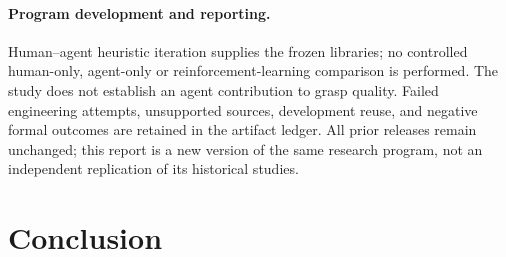 \paragraph{Program development and reporting.}
Human--agent heuristic iteration supplies the frozen libraries; no controlled
human-only, agent-only or reinforcement-learning comparison is performed. The
study does not establish an agent contribution to grasp quality. Failed
engineering attempts, unsupported sources, development reuse, and negative
formal outcomes are retained in the artifact ledger. All prior releases remain
unchanged; this report is a new version of the same research program, not an
independent replication of its historical studies.

\section{Conclusion}

